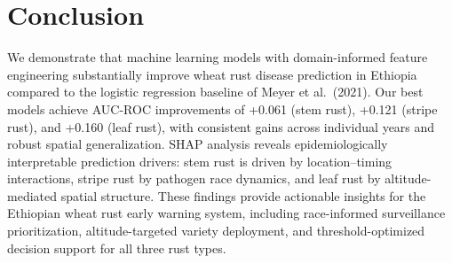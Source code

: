 \documentclass[10pt,twocolumn,letterpaper]{article}
\begin{document}
\section{Conclusion}
\label{sec:conclusion}

We demonstrate that machine learning models with domain-informed feature engineering substantially improve wheat rust disease prediction in Ethiopia compared to the logistic regression baseline of Meyer et al.\ (2021). Our best models achieve AUC-ROC improvements of +0.061 (stem rust), +0.121 (stripe rust), and +0.160 (leaf rust), with consistent gains across individual years and robust spatial generalization. SHAP analysis reveals epidemiologically interpretable prediction drivers: stem rust is driven by location--timing interactions, stripe rust by pathogen race dynamics, and leaf rust by altitude-mediated spatial structure. These findings provide actionable insights for the Ethiopian wheat rust early warning system, including race-informed surveillance prioritization, altitude-targeted variety deployment, and threshold-optimized decision support for all three rust types.
\end{document}
